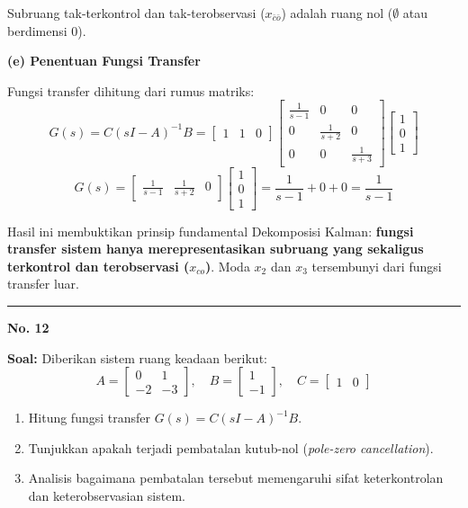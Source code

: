 \documentclass[11pt,a4paper]{article}
\begin{document}
Subruang tak-terkontrol dan tak-terobservasi ($x_{\bar{c}\bar{o}}$) adalah ruang nol ($\emptyset$ atau berdimensi 0).

\textbf{(e) Penentuan Fungsi Transfer}

Fungsi transfer dihitung dari rumus matriks:
$$G(s) = C(sI - A)^{-1}B = \begin{bmatrix} 1 & 1 & 0 \end{bmatrix} \begin{bmatrix} \frac{1}{s - 1} & 0 & 0 \\ 0 & \frac{1}{s + 2} & 0 \\ 0 & 0 & \frac{1}{s + 3} \end{bmatrix} \begin{bmatrix} 1 \\ 0 \\ 1 \end{bmatrix}$$
$$G(s) = \begin{bmatrix} \frac{1}{s - 1} & \frac{1}{s + 2} & 0 \end{bmatrix} \begin{bmatrix} 1 \\ 0 \\ 1 \end{bmatrix} = \frac{1}{s - 1} + 0 + 0 = \frac{1}{s - 1}$$

Hasil ini membuktikan prinsip fundamental Dekomposisi Kalman: \textbf{fungsi transfer sistem hanya merepresentasikan subruang yang sekaligus terkontrol dan terobservasi ($x_{co}$)}. Moda $x_2$ dan $x_3$ tersembunyi dari fungsi transfer luar.

\vspace{12pt}
\hrule
\vspace{10pt}

\textbf{\large No. 12}

\textbf{Soal:}  
Diberikan sistem ruang keadaan berikut:
$$A = \begin{bmatrix} 0 & 1 \\ -2 & -3 \end{bmatrix}, \quad B = \begin{bmatrix} 1 \\ -1 \end{bmatrix}, \quad C = \begin{bmatrix} 1 & 0 \end{bmatrix}$$
\begin{enumerate}[label=(\alph*)]
    \item Hitung fungsi transfer $G(s) = C(sI - A)^{-1} B$.
    \item Tunjukkan apakah terjadi pembatalan kutub-nol (\textit{pole-zero cancellation}).
    \item Analisis bagaimana pembatalan tersebut memengaruhi sifat keterkontrolan dan keterobservasian sistem.
\end{enumerate}
\end{document}
